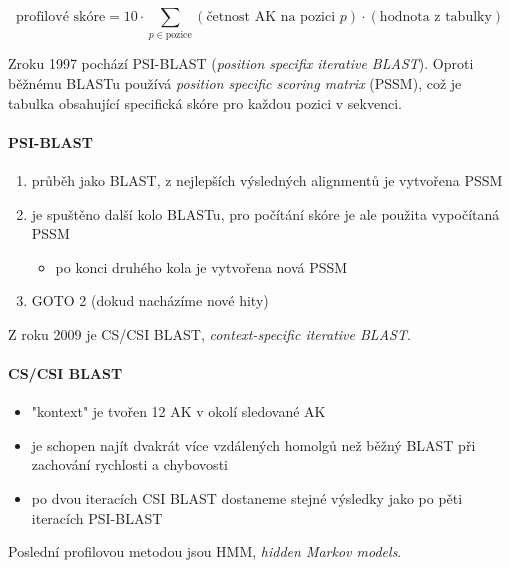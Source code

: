 \documentclass[DIV=8]{scrreprt}
\begin{document}
\[\text{profilové skóre} = 10 \cdot \sum_{p \in \text{pozice}} (\text{četnost AK na pozici } p) \cdot (\text{hodnota z tabulky})\]

Zroku 1997 pochází PSI-BLAST (\emph{position specifix iterative BLAST}). Oproti běžnému BLASTu používá \emph{position specific scoring matrix} (PSSM), což je tabulka obsahující specifická skóre pro každou pozici v sekvenci.

\paragraph{PSI-BLAST}
\begin{enumerate}[nosep]
    \item průběh jako BLAST, z nejlepších výsledných alignmentů je vytvořena PSSM
    \item je spuštěno další kolo BLASTu, pro počítání skóre je ale použita vypočítaná PSSM
\begin{itemize}[nosep]
    \item po konci druhého kola je vytvořena nová PSSM
\end{itemize}

    \item GOTO 2 (dokud nacházíme nové hity)
\end{enumerate}



Z roku 2009 je CS/CSI BLAST, \emph{context-specific iterative BLAST}.

\paragraph{CS/CSI BLAST}
\begin{itemize}[nosep]
    \item "kontext" je tvořen 12 AK v okolí sledované AK
    \item je schopen najít dvakrát více vzdálených homolgů než běžný BLAST při zachování rychlosti a chybovosti
    \item po dvou iteracích CSI BLAST dostaneme stejné výsledky jako po pěti iteracích PSI-BLAST
\end{itemize}



Poslední profilovou metodou jsou HMM, \emph{hidden Markov models}.
\end{document}
